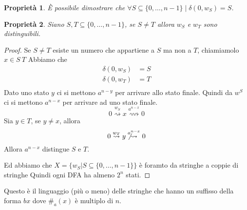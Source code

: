 \documentclass[12pt]{report}
\newtheorem{proprietà}{Proprietà}
\begin{document}
	\begin{proprietà}
	\`E possibile dimostrare che $\forall S \subseteq \{0, \dots, n - 1\} \mid \delta(0, w_S) = S$. %
	\end{proprietà}
	\begin{proprietà}
	Siano $S, T \subseteq \{0, \dots, n - 1\}$, se $S \neq T$ allora $w_S$ e $w_T$ sono distinguibili. %
	\end{proprietà}
	\begin{proof}	%
		Se $S \neq T$ esiste un numero che appartiene a $S$ ma non a $T$, chiamiamolo $x \in S \ T$ %
		Abbiamo che
		\begin{align*}
			\delta(0, w_S) &= S \\
			\delta(0, w_T) &= T \\
		\end{align*}
		Dato uno stato $y$ ci si mettono $a^{n - y}$ per arrivare allo stato finale.
		Quindi da $w^S$ ci si mettono $a^{n - x}$ per arrivare ad uno stato finale.
		$$ 0 \overset{w_S}{\rightsquigarrow} x \overset{a^{n - x}}{\rightsquigarrow} 0 $$
		Sia $y \in T$, se $y \neq x$, allora
		$$ 0 \overset{w_T}{\rightsquigarrow} y \not \overset{a^{n - x}}{\rightsquigarrow} 0 $$
		Allora $a^{n - x}$ distingue $S$ e $T$.

		Ed abbiamo che $X = \{ w_S | S \subseteq \{0, \dots, n - 1 \} \}$ è foramto da stringhe a coppie di stringhe %
		Quindi ogni DFA ha almeno $2^n$ stati.
	\end{proof}
	Questo è il linguaggio (più o meno) delle stringhe che hanno un suffisso della forma $bx$ dove $\#_a(x)$ è multiplo di $n$.
\end{document}
